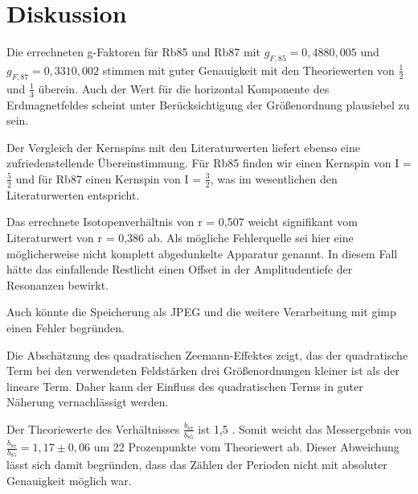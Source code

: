 \section{Diskussion}
Die errechneten g-Faktoren für Rb85 und Rb87 mit $g_{F,85} = 0,488 $\pm$ 0,005$ und
$g_{F,87} = 0,331 $\pm$ 0,002$ stimmen mit guter Genauigkeit mit den Theoriewerten von $\frac{1}{2}$ und $\frac{1}{3}$ überein.
Auch der Wert für die horizontal Komponente des Erdmagnetfeldes scheint unter Berücksichtigung der Größenordnung plausiebel zu sein.

Der Vergleich der Kernspins mit den Literaturwerten liefert ebenso eine zufriedenstellende Übereinstimmung.
Für Rb85 finden wir einen Kernspin von  I = $\frac{5}{2}$ und für Rb87 einen Kernspin von I = $\frac{3}{2}$, was im wesentlichen den
Literaturwerten entspricht.

Das errechnete Isotopenverhältnis von r = 0,507 weicht signifikant vom Literaturwert von r = 0,386  ab. Als mögliche Fehlerquelle
sei hier eine möglicherweise nicht komplett abgedunkelte Apparatur genannt. In diesem Fall hätte das einfallende Restlicht
einen Offset in der Amplitudentiefe der Resonanzen bewirkt.

Auch könnte die Speicherung als JPEG und die weitere Verarbeitung mit gimp einen Fehler begründen.

Die Abschätzung des quadratischen Zeemann-Effektes zeigt, das der quadratische Term bei den verwendeten Feldstärken drei Größenordnungen kleiner ist als
der lineare Term. Daher kann der Einfluss des quadratischen Terms in guter Näherung vernachlässigt werden.

Der Theoriewerte des Verhältnisses $\frac{b_{87}}{b_{85}}$ ist 1,5 \cite{FP}. Somit weicht das Messergebnis von $\frac{b_{87}}{b_{85}} = 1,17 \pm 0,06$ um 22 Prozenpunkte vom Theoriewert ab.
Dieser Abweichung lässt sich damit begründen, dass das Zählen der Perioden nicht mit absoluter Genauigkeit möglich war.
\printbibliography
